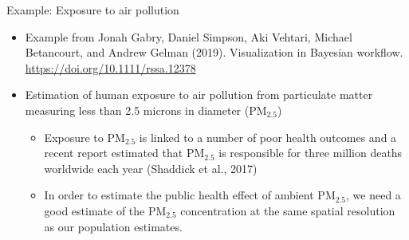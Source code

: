 \documentclass[t]{beamer}
\begin{document}
\begin{frame}{Example: Exposure to air pollution}

  \begin{itemize}
  \item Example from Jonah Gabry, Daniel Simpson, Aki Vehtari, Michael
    Betancourt, and Andrew Gelman (2019). Visualization in Bayesian
    workflow. \url{https://doi.org/10.1111/rssa.12378}
  \item Estimation of human exposure to air pollution from particulate
    matter measuring less than 2.5 microns in diameter ($\mathrm{PM}_{2.5}$)
    \begin{itemize}
    \item Exposure to $\mathrm{PM}_{2.5}$ is linked to a number of
      poor health outcomes and a recent report estimated that
      $\mathrm{PM}_{2.5}$ is responsible for three million deaths
      worldwide each year (Shaddick et al., 2017)
    \item In order to estimate the public health effect of ambient
      $\mathrm{PM}_{2.5}$, we need a good estimate of the
      $\mathrm{PM}_{2.5}$ concentration at the same spatial resolution
      as our population estimates.
    \end{itemize}
\end{itemize}

\end{frame}
\end{document}
